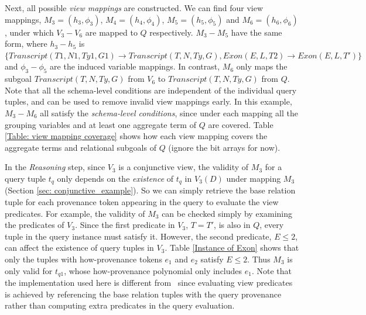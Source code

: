 \begin{example}
Next, all possible {\em view mappings} are constructed. We can find four view mappings, $M_3=(h_3,\phi_3)$, $M_4=(h_4, \phi_4)$, $M_5=(h_5, \phi_5)$ and $M_6=(h_6, \phi_6)$, under which $V_3-V_6$ are mapped to $Q$ respectively. $M_3-M_5$ have the same form, where $h_3-h_5$ is $\{Transcript(T1, N1, Ty1, G1) \rightarrow Transcript(T, N, Ty, G), Exon(E, L, T2)\rightarrow Exon(E, L, T')\}$ and $\phi_3-\phi_5$ are the induced variable mappings. In contrast, $M_6$ only maps the subgoal $Transcript(T, N, Ty, G)$ from $V_6$ to $Transcript(T, N, Ty, G)$ from $Q$. Note that all the {schema-level conditions} are independent of the individual query tuples, and can be used to remove invalid view mappings early. In this example, $M_3-M_6$ all satisfy the {\em schema-level conditions}, since under each mapping all the grouping variables and at least one aggregate term of $Q$ are {covered}. Table \ref{Table: view mapping coverage} shows how each view mapping covers the aggregate terms and relational subgoals of $Q$ (ignore the bit arrays for now).

In the {\em Reasoning} step, since $V_3$ is a {conjunctive view}, the validity of $M_3$ for a query tuple $t_q$ only depends on the {\em existence} of $t_q$ in $V_3(D)$ under mapping $M_3$ (Section \ref{sec: conjunctive_example}). So we can simply retrieve the base relation tuple for each provenance token appearing in the query to evaluate the view {predicates}. For example, the validity of $M_3$ can be checked simply by examining the predicates of $V_3$. Since the first predicate in $V_3$, $T = T'$, is also in $Q$, every tuple in the query instance must satisfy it. However, the second predicate, $E \leq 2$, can affect the {existence} of query tuples in $V_3$. Table \ref{Instance of Exon} shows that only the tuples with how-provenance tokens $e_1$ and $e_2$ satisfy $E \leq 2$. Thus $M_3$ is only valid for $t_{{q}1}$, whose how-provenance polynomial only includes $e_1$. %
{Note that the implementation used here is different from \rba\ since evaluating view predicates is achieved by {referencing the base relation tuples with the query provenance} rather than computing extra predicates in the query evaluation.}  


\end{example}
